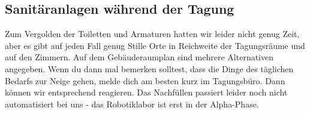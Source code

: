\subsection{Sanitäranlagen während der Tagung}

Zum Vergolden der Toiletten und Armaturen hatten wir leider nicht genug Zeit, aber es gibt auf jeden Fall genug Stille Orte in Reichweite der Tagungsräume und auf den Zimmern. Auf dem Gebäuderaumplan sind mehrere Alternativen angegeben. Wenn du dann mal bemerken solltest, dass die Dinge des täglichen Bedarfs zur Neige gehen, melde dich am besten kurz im Tagungsbüro. Dann können wir entsprechend reagieren. Das Nachfüllen passiert leider noch nicht automatisiert bei uns - das Robotiklabor ist erst in der Alpha-Phase.
